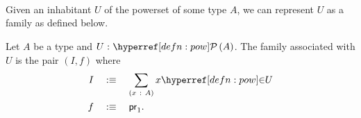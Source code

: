 \begin{center}
\begin{code}%
\>[0]\AgdaSpace{}%
\AgdaSymbol{:}\AgdaSpace{}%
\AgdaSymbol{\{}\AgdaSpace{}%
\AgdaSymbol{:}\AgdaSpace{}%
\AgdaSpace{}%
\AgdaSymbol{\}}\AgdaSpace{}%
\AgdaSymbol{\{}\AgdaSpace{}%
\AgdaSymbol{:}\AgdaSpace{}%
\AgdaSpace{}%
\AgdaSymbol{\}}\AgdaSpace{}%
\AgdaSpace{}%
\AgdaSymbol{(}\AgdaSpace{}%
\AgdaSymbol{:}\AgdaSpace{}%
\AgdaSpace{}%
\AgdaSpace{}%
\AgdaSymbol{)}\AgdaSpace{}%
\AgdaSpace{}%
\AgdaSymbol{(}\AgdaSpace{}%
\AgdaSymbol{:}\AgdaSpace{}%
\AgdaSpace{}%
\AgdaSpace{}%
\AgdaSymbol{)}\AgdaSpace{}%
\AgdaSpace{}%
\AgdaSpace{}%
\AgdaSpace{}%
\<%
\\
\>[0]\AgdaSpace{}%
\AgdaSpace{}%
\AgdaSpace{}%
\AgdaSymbol{=}\AgdaSpace{}%
\AgdaSpace{}%
\AgdaOperator{\AgdaInductiveConstructor{,}}\AgdaSpace{}%
\AgdaSpace{}%
\AgdaSpace{}%
\AgdaSpace{}\<%
\\
%
\\[\AgdaEmptyExtraSkip]%
\>[0]\AgdaSpace{}%
\AgdaSpace{}%
\AgdaSpace{}%
\AgdaSpace{}%
\AgdaSpace{}%
\AgdaSymbol{)}\AgdaSpace{}%
\AgdaSpace{}%
\AgdaSymbol{=}\AgdaSpace{}%
\AgdaSpace{}%
\AgdaSpace{}%
\AgdaSpace{}%
\AgdaSpace{}%
\AgdaSpace{}%
\AgdaSpace{}%
\<%
\end{code}
\end{center}

Given an inhabitant $U$ of the powerset of some type $A$, we can represent $U$ as a family
as defined below.
\begin{defn}
  Let $A$ be a type and $\oftyI{U}{\pow{A}}$. The family associated with $U$ is
  the pair $(I, f)$ where
  \begin{align*}
    I \quad&\is\quad \sigmaty{x}{A}{\mempow{x}{U}} \\
    f \quad&\is\quad \mathsf{pr}_1        .
  \end{align*}
\end{defn}

